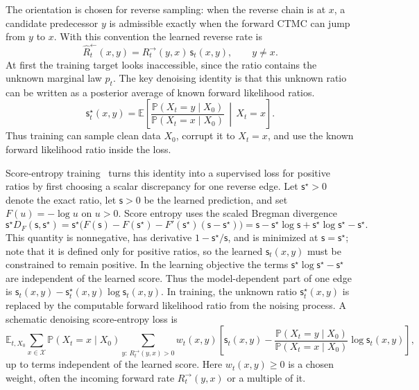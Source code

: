 \documentclass{amsart}
\numberwithin{equation}{section}
\theoremstyle{plain}
\theoremstyle{definition}
\theoremstyle{remark}
\newcommand{\E}{\mathbb{E}}
\newcommand{\Pp}{\mathbb{P}}
\newcommand{\cX}{\mathcal{X}}
\newcommand{\wh}[1]{\widehat{#1}}
\newcommand{\sstar}{\mathsf{s}^{\star}}
\newcommand{\score}{\mathsf{s}}
\begin{document}
The orientation is chosen for reverse sampling: when the reverse chain is at
$x$, a candidate predecessor $y$ is admissible exactly when the forward CTMC can
jump from $y$ to $x$.  With this convention the learned reverse rate is
\[
    \wh R_t^{\leftarrow}(x,y)
    =
    R_t^{\to}(y,x)\,\score_t(x,y),
    \qquad y\neq x.
\]
At first the training target looks inaccessible, since the ratio contains the
unknown marginal law $p_t$.  The key denoising identity is that this unknown
ratio can be written as a posterior average of known forward likelihood ratios.
\begin{equation}\label{eq:discrete-ratio-denoising-identity}
    \sstar_t(x,y)
    =
    \E\!\left[
    \frac{\Pp(X_t=y\mid X_0)}{\Pp(X_t=x\mid X_0)}
    \,\middle|\, X_t=x
    \right].
\end{equation}
Thus training can sample clean data $X_0$, corrupt it to $X_t=x$, and use the
known forward likelihood ratio inside the loss.

Score-entropy training~\cite{lou2024sedd} turns this identity into a supervised
loss for positive ratios by first choosing a scalar discrepancy for one reverse
edge.  Let $\sstar>0$ denote the exact ratio, let $\score>0$ be the learned
prediction, and set $F(u)=-\log u$ on $u>0$.  Score entropy uses the scaled
Bregman divergence
\[
    \sstar D_F(\score,\sstar)
    =
    \sstar\bigl(F(\score)-F(\sstar)-F'(\sstar)(\score-\sstar)\bigr)
    =
    \score-\sstar\log\score+\sstar\log\sstar-\sstar.
\]
This quantity is nonnegative, has derivative $1-\sstar/\score$, and is minimized
at $\score=\sstar$; note that it is defined only for positive ratios, so the
learned $\score_t(x,y)$ must be constrained to remain positive.  In the learning objective the terms
$\sstar\log\sstar-\sstar$ are independent of the learned score.  Thus the
model-dependent part of one edge is
$\score_t(x,y)-\sstar_t(x,y)\log \score_t(x,y)$.  In training, the unknown
ratio $\sstar_t(x,y)$ is replaced by the computable forward likelihood ratio
from the noising process.
A schematic denoising score-entropy loss is
\begin{equation}\label{eq:score-entropy-loss}
    \E_{t,X_0}
    \sum_{x\in\cX}\Pp(X_t=x\mid X_0)
    \sum_{y:\,R_t^{\to}(y,x)>0}
    w_t(x,y)
    \left[
    \score_t(x,y)
    -
    \frac{\Pp(X_t=y\mid X_0)}{\Pp(X_t=x\mid X_0)}
    \log \score_t(x,y)
    \right],
\end{equation}
up to terms independent of the learned score.  Here $w_t(x,y)\geq0$ is a chosen
weight, often the incoming forward rate $R_t^{\to}(y,x)$ or a multiple of it.
\end{document}

